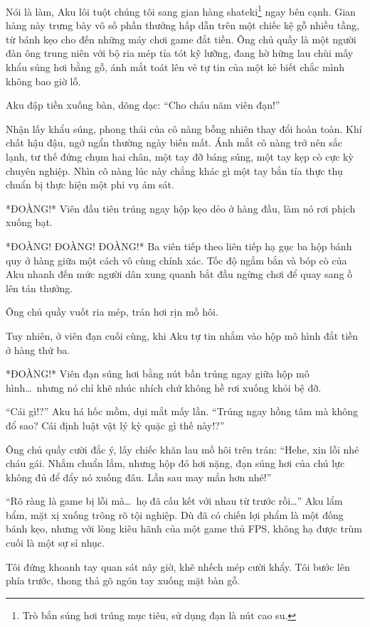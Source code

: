 \documentclass[../main.tex]{subfiles}
\begin{document}
Nói là làm, Aku lôi tuột chúng tôi sang gian hàng shateki\footnote{Trò bắn súng hơi trúng mục tiêu, sử dụng đạn là nút cao su.} ngay bên cạnh. Gian hàng này trưng bày vô số phần thưởng hấp dẫn trên một chiếc kệ gỗ nhiều tầng, từ bánh kẹo cho đến những máy chơi game đắt tiền. Ông chủ quầy là một người đàn ông trung niên với bộ ria mép tỉa tót kỹ lưỡng, đang hờ hững lau chùi mấy khẩu súng hơi bằng gỗ, ánh mắt toát lên vẻ tự tin của một kẻ biết chắc mình không bao giờ lỗ.

Aku đập tiền xuống bàn, dõng dạc: ``Cho cháu năm viên đạn!''

Nhận lấy khẩu súng, phong thái của cô nàng bỗng nhiên thay đổi hoàn toàn. Khí chất hậu đậu, ngớ ngẩn thường ngày biến mất. Ánh mắt cô nàng trở nên sắc lạnh, tư thế đứng chụm hai chân, một tay đỡ báng súng, một tay kẹp cò cực kỳ chuyên nghiệp. Nhìn cô nàng lúc này chẳng khác gì một tay bắn tỉa thực thụ chuẩn bị thực hiện một phi vụ ám sát.

*ĐOÀNG!* Viên đầu tiên trúng ngay hộp kẹo dẻo ở hàng đầu, làm nó rơi phịch xuống bạt.

*ĐOÀNG! ĐOÀNG! ĐOÀNG!* Ba viên tiếp theo liên tiếp hạ gục ba hộp bánh quy ở hàng giữa một cách vô cùng chính xác. Tốc độ ngắm bắn và bóp cò của Aku nhanh đến mức người dân xung quanh bắt đầu ngừng chơi để quay sang ồ lên tán thưởng.

Ông chủ quầy vuốt ria mép, trán hơi rịn mồ hôi.

Tuy nhiên, ở viên đạn cuối cùng, khi Aku tự tin nhắm vào hộp mô hình đắt tiền ở hàng thứ ba.

*ĐOÀNG!* Viên đạn súng hơi bằng nút bần trúng ngay giữa hộp mô hình\dots\ nhưng nó chỉ khẽ nhúc nhích chứ không hề rơi xuống khỏi bệ đỡ.

``Cái gì!?'' Aku há hốc mồm, dụi mắt mấy lần. ``Trúng ngay hồng tâm mà không đổ sao? Cái định luật vật lý kỳ quặc gì thế này!?''

Ông chủ quầy cười đắc ý, lấy chiếc khăn lau mồ hôi trên trán: ``Hehe, xin lỗi nhé cháu gái. Nhắm chuẩn lắm, nhưng hộp đó hơi nặng, đạn súng hơi của chú lực không đủ để đẩy nó xuống đâu. Lần sau may mắn hơn nhé!''

``Rõ ràng là game bị lỗi mà\dots\ họ đã cấu kết với nhau từ trước rồi\dots'' Aku lẩm bẩm, mặt xị xuống trông rõ tội nghiệp. Dù đã có chiến lợi phẩm là một đống bánh kẹo, nhưng với lòng kiêu hãnh của một game thủ FPS, không hạ được trùm cuối là một sự sỉ nhục.

Tôi đứng khoanh tay quan sát nãy giờ, khẽ nhếch mép cười khẩy. Tôi bước lên phía trước, thong thả gõ ngón tay xuống mặt bàn gỗ.
\end{document}
